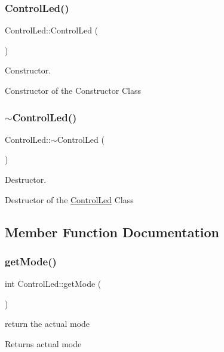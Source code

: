\subsubsection{\texorpdfstring{Control\+Led()}{ControlLed()}}
{\footnotesize\ttfamily Control\+Led\+::\+Control\+Led (\begin{DoxyParamCaption}{ }\end{DoxyParamCaption})}



Constructor. 

Constructor of the Constructor Class\textquotesingle{} \mbox{\label{class_control_led_a000f646cd9b99279b59563a990a8a13c}} 
\subsubsection{\texorpdfstring{$\sim$\+Control\+Led()}{~ControlLed()}}
{\footnotesize\ttfamily Control\+Led\+::$\sim$\+Control\+Led (\begin{DoxyParamCaption}{ }\end{DoxyParamCaption})}



Destructor. 

Destructor of the \hyperlink{class_control_led}{Control\+Led} Class\textquotesingle{} 

\subsection{Member Function Documentation}
\mbox{\label{class_control_led_a65c6179e8e2a3147cbfb774aebab29e8}} 
\subsubsection{\texorpdfstring{get\+Mode()}{getMode()}}
{\footnotesize\ttfamily int Control\+Led\+::get\+Mode (\begin{DoxyParamCaption}{ }\end{DoxyParamCaption})}



return the actual mode 

\begin{DoxyReturn}{Returns}
actual mode 
\end{DoxyReturn}
\mbox{\label{class_control_led_abf3b6b900e2ab5bb0d5e2ce3bdfa7bfa}} 
